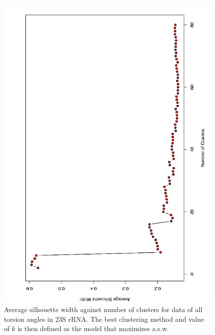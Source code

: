 \begin{figure}[H]
\centering
\includegraphics[angle=270, scale=0.48]{Chapter2/pam_asw_2_80_torsions.png}
\caption{Average silhouette width against  number of clusters for data
of  all torsion angles  in 23S  rRNA. The  best clustering  method and
value of $k$ is then defined as the model that maximizes a.s.w.}
\label{fig:asw}
\end{figure}

